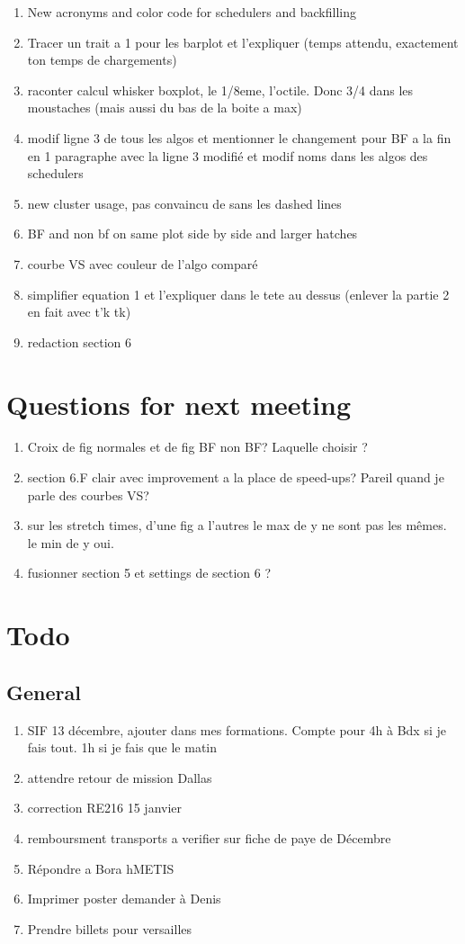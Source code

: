 \documentclass[a4paper]{article}
\begin{document}
\begin{enumerate}
		\item New acronyms and color code for schedulers and backfilling
		\item Tracer un trait a 1 pour les barplot et l'expliquer (temps attendu, exactement ton temps de chargements)
		\item raconter calcul whisker boxplot, le 1/8eme, l'octile. Donc 3/4 dans les moustaches (mais aussi du bas de la boite a max)
		\item modif ligne 3 de tous les algos et mentionner le changement pour BF a la fin en 1 paragraphe avec la ligne 3 modifié et modif noms dans les algos des schedulers
		\item new cluster usage, pas convaincu de sans les dashed lines
		\item BF and non bf on same plot side by side and larger hatches
		\item courbe VS avec couleur de l'algo comparé
		\item simplifier equation 1 et l'expliquer dans le tete au dessus (enlever la partie 2 en fait avec t'k tk)
		\item redaction section 6
	\end{enumerate}
	
\section{Questions for next meeting}
	\begin{enumerate}
		\item Croix de fig normales et de fig BF non BF? Laquelle choisir ?
		\item section 6.F clair avec improvement a la place de speed-ups? Pareil quand je parle des courbes VS?
		\item sur les stretch times, d'une fig a l'autres le max de y ne sont pas les mêmes. le min de y oui.
		\item fusionner section 5 et settings de section 6 ?
	\end{enumerate}
	
\section{Todo}
	\subsection{General}
		\begin{enumerate}
			\item SIF 13 décembre, ajouter dans mes formations. Compte pour 4h à Bdx si je fais tout. 1h si je fais que le matin
			\item attendre retour de mission Dallas
			\item correction RE216 15 janvier
			\item remboursment transports a verifier sur fiche de paye de Décembre
			\item Répondre a Bora hMETIS
			\item Imprimer poster demander à Denis
			\item Prendre billets pour versailles
		\end{enumerate}
\end{document}
